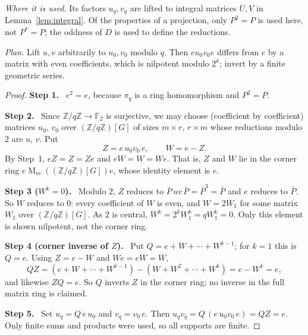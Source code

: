 \documentclass[11pt]{article}
\theoremstyle{remark}
\numberwithin{equation}{section}
\newcommand{\F}{\mathbb F}
\newcommand{\Z}{\mathbb Z}
\newcommand{\Mat}{\operatorname{M}}
\newcommand{\step}[1]{\par\smallskip\noindent\textbf{Step #1.}\ }
\begin{document}
\noindent\emph{Where it is used.} Its factors $u_q,v_q$ are lifted to integral matrices $U,V$ in Lemma~\ref{lem:integral}. Of the properties of a projection, only $P^2=P$ is used here, not $P^*=P$; the oddness of $D$ is used to define the reductions.

\noindent\emph{Plan.} Lift $u,v$ arbitrarily to $u_0,v_0$ modulo $q$. Then $eu_0v_0e$ differs from $e$ by a matrix with even coefficients, which is nilpotent modulo $2^k$; invert by a finite geometric series.

\begin{proof}
\step{1} $e^2=e$, because $\pi_q$ is a ring homomorphism and $P^2=P$.

\step{2} Since $\Z/q\Z\to\F_2$ is surjective, we may choose (coefficient by coefficient) matrices $u_0$, $v_0$ over $(\Z/q\Z)[G]$ of sizes $m\times r$, $r\times m$ whose reductions modulo $2$ are $u$, $v$. Put
\[
 Z=e\,u_0v_0\,e,\qquad W=e-Z .
\]
By Step~1, $eZ=Z=Ze$ and $eW=W=We$. That is, $Z$ and $W$ lie in the corner ring $e\Mat_m((\Z/q\Z)[G])e$, whose identity element is $e$.

\step{3 ($W^k=0$)} Modulo $2$, $Z$ reduces to $\bar P\,uv\,\bar P=\bar P^3=\bar P$ and $e$ reduces to $\bar P$. So $W$ reduces to $0$: every coefficient of $W$ is even, and $W=2W_1$ for some matrix $W_1$ over $(\Z/q\Z)[G]$. As $2$ is central, $W^k=2^kW_1^k=qW_1^k=0$. Only this element is shown nilpotent, not the corner ring.

\step{4 (corner inverse of $Z$)} Put $Q=e+W+\cdots+W^{k-1}$; for $k=1$ this is $Q=e$. Using $Z=e-W$ and $We=eW=W$,
\[
 QZ=(e+W+\cdots+W^{k-1})-(W+W^2+\cdots+W^{k})=e-W^k=e,
\]
and likewise $ZQ=e$. So $Q$ inverts $Z$ in the corner ring; no inverse in the full matrix ring is claimed.

\step{5} Set $u_q=Q\,e\,u_0$ and $v_q=v_0\,e$. Then $u_qv_q=Q\,(e\,u_0v_0\,e)=QZ=e$. Only finite sums and products were used, so all supports are finite.
\end{proof}
\end{document}
